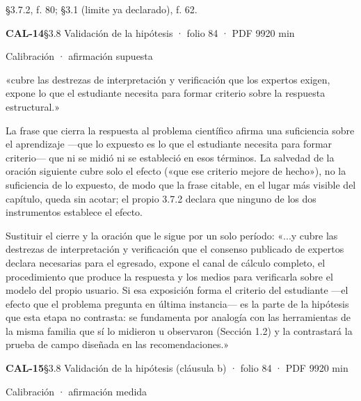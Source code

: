 {\small{}§3.7.2, f. 80; §3.1 (limite ya declarado), f. 62.\par}
\vspace{6pt}
\noindent\casilla\textbf{CAL-14}\quad{}\quad §3.8 Validación de la hipótesis · folio 84 · PDF 99\hfill 20 min\par\vspace{1pt}
{\small\color{gris}Calibración · afirmación supuesta}\par
\begin{dice}«cubre las destrezas de interpretación y verificación que los expertos exigen, expone lo que el estudiante necesita para formar criterio sobre la respuesta estructural.»\end{dice}
{\small{}La frase que cierra la respuesta al problema científico afirma una suficiencia sobre el aprendizaje —que lo expuesto es lo que el estudiante necesita para formar criterio— que ni se midió ni se estableció en esos términos. La salvedad de la oración siguiente cubre solo el efecto («que ese criterio mejore de hecho»), no la suficiencia de lo expuesto, de modo que la frase citable, en el lugar más visible del capítulo, queda sin acotar; el propio 3.7.2 declara que ninguno de los dos instrumentos establece el efecto.\par}
\begin{debedecir}Sustituir el cierre y la oración que le sigue por un solo período: «...y cubre las destrezas de interpretación y verificación que el consenso publicado de expertos declara necesarias para el egresado, expone el canal de cálculo completo, el procedimiento que produce la respuesta y los medios para verificarla sobre el modelo del propio usuario. Si esa exposición forma el criterio del estudiante —el efecto que el problema pregunta en última instancia— es la parte de la hipótesis que esta etapa no contrasta: se fundamenta por analogía con las herramientas de la misma familia que sí lo midieron u observaron (Sección 1.2) y la contrastará la prueba de campo diseñada en las recomendaciones.»\end{debedecir}
\vspace{6pt}
\noindent\casilla\textbf{CAL-15}\quad{}\quad §3.8 Validación de la hipótesis (cláusula b) · folio 84 · PDF 99\hfill 20 min\par\vspace{1pt}
{\small\color{gris}Calibración · afirmación medida}\par
